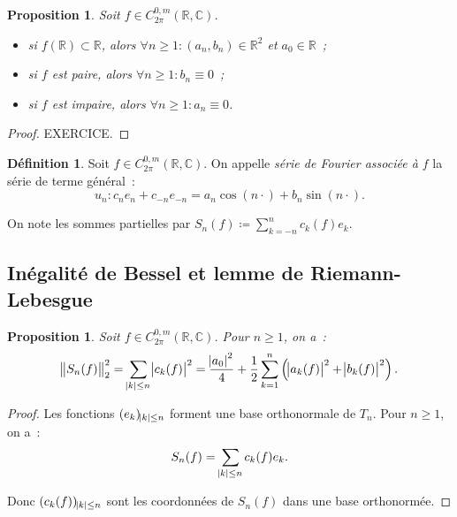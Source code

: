 \documentclass{report}
\newtheorem{prp}[thm]{Proposition}
\theoremstyle{definition}
\newtheorem{déf}[thm]{Définition}
\theoremstyle{remark}
\numberwithin{equation}{section}
\newcommand{\C}{\mathbb C}
\newcommand{\R}{\mathbb R}
\newcommand{\CmT}[2]{C^{#1,m}_{#2}}
\newcommand{\CzmT}[1]{\CmT 0{#1}}
\newcommand{\Czm}{\CzmT{2\pi}}
\begin{document}
			\begin{prp} Soit $f \in \Czm(\R, \C)$.
			\begin{itemize}
				\item si $f(\R) \subset \R$, alors $\forall n \geq 1 : (a_n, b_n) \in \R^2$ et $a_0 \in \R$~;
				\item si $f$ est paire, alors $\forall n \geq 1 : b_n \equiv 0$~;
				\item si $f$ est impaire, alors $\forall n \geq 1 : a_n \equiv 0$.
			\end{itemize}
			\end{prp}

			\begin{proof} EXERCICE.
			\end{proof}

			\begin{déf} Soit $f \in \Czm(\R, \C)$. On appelle \textit{série de Fourier associée à $f$} la série de terme général~:
			\begin{equation}
				u_n : c_ne_n + c_{-n}e_{-n} = a_n\cos(n\cdot) + b_n\sin(n\cdot).
			\end{equation}

			On note les sommes partielles par $S_n(f) \coloneqq \sum_{k=-n}^nc_k(f)e_k$.
			\end{déf}

		\subsection{Inégalité de Bessel et lemme de Riemann-Lebesgue}
			\begin{prp} Soit $f \in \Czm(\R, \C)$. Pour $n \geq 1$, on a~:
			\begin{equation}
				\norm {S_n(f)}_2^2 = \sum_{\abs k \leq n} \abs {c_k(f)}^2 = \frac {\abs {a_0}^2}4 + \frac 12\sum_{k=1}^n\left(\abs {a_k(f)}^2 + \abs {b_k(f)}^2\right).
			\end{equation}
			\end{prp}

			\begin{proof} Les fonctions $(e_k)_{\abs k \leq n}$ forment une base orthonormale de $T_n$. Pour $n \geq 1$, on a~:
			\begin{equation}
				S_n(f) = \sum_{\abs k \leq n}c_k(f)e_k.
			\end{equation}

			Donc $(c_k(f))_{\abs k \leq n}$ sont les coordonnées de $S_n(f)$ dans une base orthonormée.
			\end{proof}
\end{document}
